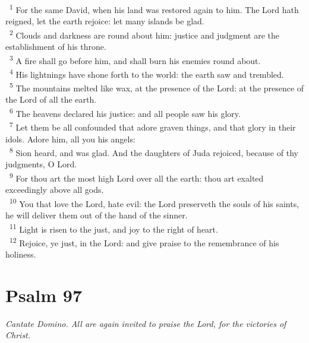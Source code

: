 \documentclass[a5paper,12pt]{article}
\begin{document}
\begin{multicols*}{2}
~\textsuperscript{1} For the same David, when his land was restored again to him. The Lord hath reigned, let the earth rejoice: let many islands be glad.\\
~\textsuperscript{2} Clouds and darkness are round about him: justice and judgment are the establishment of his throne.\\
~\textsuperscript{3} A fire shall go before him, and shall burn his enemies round about.\\
~\textsuperscript{4} His lightnings have shone forth to the world: the earth saw and trembled.\\
~\textsuperscript{5} The mountains melted like wax, at the presence of the Lord: at the presence of the Lord of all the earth.\\
~\textsuperscript{6} The heavens declared his justice: and all people saw his glory.\\
~\textsuperscript{7} Let them be all confounded that adore graven things, and that glory in their idols. Adore him, all you his angels:\\
~\textsuperscript{8} Sion heard, and was glad. And the daughters of Juda rejoiced, because of thy judgments, O Lord.\\
~\textsuperscript{9} For thou art the most high Lord over all the earth: thou art exalted exceedingly above all gods.\\
~\textsuperscript{10} You that love the Lord, hate evil: the Lord preserveth the souls of his saints, he will deliver them out of the hand of the sinner.\\
~\textsuperscript{11} Light is risen to the just, and joy to the right of heart.\\
~\textsuperscript{12} Rejoice, ye just, in the Lord: and give praise to the remembrance of his holiness.\\

\section{Psalm 97}
\label{sec:org279a62a}
\emph{Cantate Domino. All are again invited to praise the Lord, for the victories of Christ.}\\


\end{multicols*}
\end{document}
